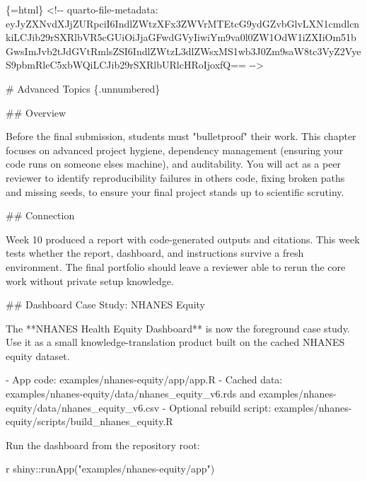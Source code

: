 \documentclass[
  letterpaper,
  DIV=11,
  numbers=noendperiod,
  oneside]{scrreprt}
\newenvironment{Shaded}{\begin{snugshade}}{\end{snugshade}}
\newcommand{\FunctionTok}[1]{\textcolor[rgb]{0.28,0.35,0.67}{#1}}
\newcommand{\InformationTok}[1]{\textcolor[rgb]{0.37,0.37,0.37}{#1}}
\newcommand{\NormalTok}[1]{\textcolor[rgb]{0.00,0.23,0.31}{#1}}
\newcommand{\SpecialCharTok}[1]{\textcolor[rgb]{0.37,0.37,0.37}{#1}}
\newcommand{\SpecialStringTok}[1]{\textcolor[rgb]{0.13,0.47,0.30}{#1}}
\newcommand{\StringTok}[1]{\textcolor[rgb]{0.13,0.47,0.30}{#1}}
\begin{document}
\begin{Shaded}
\begin{Highlighting}[numbers=left,,]
\InformationTok{\textasciigrave{}\textasciigrave{}\textasciigrave{}\{=html\}}
\InformationTok{\textless{}!{-}{-} quarto{-}file{-}metadata: eyJyZXNvdXJjZURpciI6IndlZWtzXFx3ZWVrMTEtcG9ydGZvbGlvLXN1cmdlcnkiLCJib29rSXRlbVR5cGUiOiJjaGFwdGVyIiwiYm9va0l0ZW1OdW1iZXIiOm51bGwsImJvb2tJdGVtRmlsZSI6IndlZWtzL3dlZWsxMS1wb3J0Zm9saW8tc3VyZ2VyeS9pbmRleC5xbWQiLCJib29rSXRlbURlcHRoIjoxfQ== {-}{-}\textgreater{}}
\InformationTok{\textasciigrave{}\textasciigrave{}\textasciigrave{}}

\FunctionTok{\# Advanced Topics \{.unnumbered\}}


\FunctionTok{\#\# Overview}

\NormalTok{Before the final submission, students must "bulletproof" their work. This chapter focuses on advanced project hygiene, dependency management (ensuring your code runs on someone else\textquotesingle{}s machine), and auditability. You will act as a peer reviewer to identify reproducibility failures in others\textquotesingle{} code, fixing broken paths and missing seeds, to ensure your final project stands up to scientific scrutiny.}

\FunctionTok{\#\# Connection}

\NormalTok{Week 10 produced a report with code{-}generated outputs and citations. This week tests whether the report, dashboard, and instructions survive a fresh environment. The final portfolio should leave a reviewer able to rerun the core work without private setup knowledge.}

\FunctionTok{\#\# Dashboard Case Study: NHANES Equity}

\NormalTok{The **NHANES Health Equity Dashboard** is now the foreground case study. Use it as a small knowledge{-}translation product built on the cached NHANES equity dataset.}

\SpecialStringTok{{-} }\NormalTok{App code: }\InformationTok{\textasciigrave{}examples/nhanes{-}equity/app/app.R\textasciigrave{}}
\SpecialStringTok{{-} }\NormalTok{Cached data: }\InformationTok{\textasciigrave{}examples/nhanes{-}equity/data/nhanes\_equity\_v6.rds\textasciigrave{}}\NormalTok{ and }\InformationTok{\textasciigrave{}examples/nhanes{-}equity/data/nhanes\_equity\_v6.csv\textasciigrave{}}
\SpecialStringTok{{-} }\NormalTok{Optional rebuild script: }\InformationTok{\textasciigrave{}examples/nhanes{-}equity/scripts/build\_nhanes\_equity.R\textasciigrave{}}

\NormalTok{Run the dashboard from the repository root:}

\InformationTok{\textasciigrave{}\textasciigrave{}\textasciigrave{}r}
\NormalTok{shiny}\SpecialCharTok{::}\FunctionTok{runApp}\NormalTok{(}\StringTok{"examples/nhanes{-}equity/app"}\NormalTok{)}
\InformationTok{\textasciigrave{}\textasciigrave{}\textasciigrave{}}


\end{Highlighting}
\end{Shaded}
\end{document}
